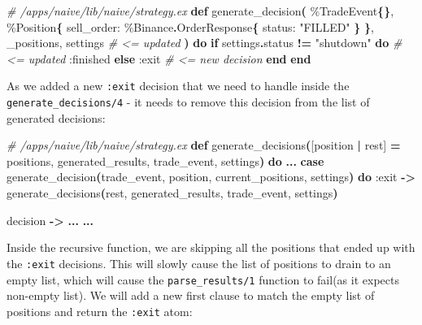 \documentclass[
  oneside]{book}
\newenvironment{Shaded}{\begin{snugshade}}{\end{snugshade}}
\newcommand{\CommentTok}[1]{\textcolor[rgb]{0.56,0.35,0.01}{\textit{#1}}}
\newcommand{\ConstantTok}[1]{\textcolor[rgb]{0.56,0.35,0.01}{#1}}
\newcommand{\ControlFlowTok}[1]{\textcolor[rgb]{0.13,0.29,0.53}{\textbf{#1}}}
\newcommand{\FunctionTok}[1]{\textcolor[rgb]{0.13,0.29,0.53}{\textbf{#1}}}
\newcommand{\KeywordTok}[1]{\textcolor[rgb]{0.13,0.29,0.53}{\textbf{#1}}}
\newcommand{\NormalTok}[1]{#1}
\newcommand{\OperatorTok}[1]{\textcolor[rgb]{0.81,0.36,0.00}{\textbf{#1}}}
\newcommand{\OtherTok}[1]{\textcolor[rgb]{0.56,0.35,0.01}{#1}}
\newcommand{\StringTok}[1]{\textcolor[rgb]{0.31,0.60,0.02}{#1}}
\newcommand{\VariableTok}[1]{\textcolor[rgb]{0.00,0.00,0.00}{#1}}
\begin{document}
\begin{Shaded}
\begin{Highlighting}[]
  \CommentTok{\# /apps/naive/lib/naive/strategy.ex}
  \KeywordTok{def}\NormalTok{ generate\_decision}\FunctionTok{(}
\NormalTok{        \%}\ConstantTok{TradeEvent}\FunctionTok{\{\}}\NormalTok{,}
\NormalTok{        \%}\ConstantTok{Position}\FunctionTok{\{}
          \VariableTok{sell\_order:}\NormalTok{ \%}\ConstantTok{Binance}\OperatorTok{.}\ConstantTok{OrderResponse}\FunctionTok{\{}
            \VariableTok{status:} \StringTok{"FILLED"}
          \FunctionTok{\}}
        \FunctionTok{\}}\NormalTok{,}
\NormalTok{        \_positions,}
\NormalTok{        settings }\CommentTok{\# \textless{}= updated}
      \FunctionTok{)} \KeywordTok{do}
    \ControlFlowTok{if}\NormalTok{ settings}\OperatorTok{.}\NormalTok{status}\OperatorTok{ !=} \StringTok{"shutdown"} \KeywordTok{do} \CommentTok{\# \textless{}= updated}
      \VariableTok{:finished}
    \ControlFlowTok{else}
      \VariableTok{:exit} \CommentTok{\# \textless{}= new decision}
    \KeywordTok{end}
  \KeywordTok{end}
\end{Highlighting}
\end{Shaded}

As we added a new \texttt{:exit} decision that we need to handle inside the \texttt{generate\_decisions/4} - it needs to remove this decision from the list of generated decisions:

\begin{Shaded}
\begin{Highlighting}[]
  \CommentTok{\# /apps/naive/lib/naive/strategy.ex}
  \KeywordTok{def}\NormalTok{ generate\_decisions}\FunctionTok{(}\OtherTok{[}\NormalTok{position }\OperatorTok{|}\NormalTok{ rest}\OtherTok{]} \OperatorTok{=}\NormalTok{ positions, generated\_results, trade\_event, settings}\FunctionTok{)} \KeywordTok{do}
    \OperatorTok{...}
    \KeywordTok{case}\NormalTok{ generate\_decision}\FunctionTok{(}\NormalTok{trade\_event, position, current\_positions, settings}\FunctionTok{)} \KeywordTok{do}
      \VariableTok{:exit} \OperatorTok{{-}\textgreater{}}
\NormalTok{        generate\_decisions}\FunctionTok{(}\NormalTok{rest, generated\_results, trade\_event, settings}\FunctionTok{)}

\NormalTok{      decision }\OperatorTok{{-}\textgreater{}} \OperatorTok{...}
      \OperatorTok{...}
\end{Highlighting}
\end{Shaded}

Inside the recursive function, we are skipping all the positions that ended up with the \texttt{:exit} decisions. This will slowly cause the list of positions to drain to an empty list, which will cause the \texttt{parse\_results/1} function to fail(as it expects non-empty list). We will add a new first clause to match the empty list of positions and return the \texttt{:exit} atom:
\end{document}
